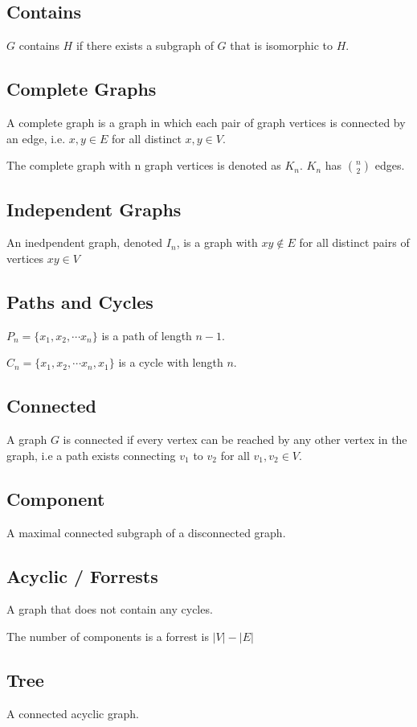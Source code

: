 \documentclass{article}
\begin{document}
\subsection{Contains}
$G$ contains $H$ if there exists a subgraph of $G$ that is isomorphic to $H$. 

\subsection{Complete Graphs}
A complete graph is a graph in which each pair of graph vertices is connected by an edge, i.e. $x, y \in E$ for all distinct $x,y \in V$. 

The complete graph with n graph vertices is denoted as $K_n$. $K_n$ has $\binom{n}{2}$ edges.

\subsection{Independent Graphs}
An inedpendent graph, denoted $I_n$, is a graph with $xy \not\in E$ for all distinct pairs of vertices $xy \in V$

\subsection{Paths and Cycles}
$P_n = \{ x_1, x_2, \cdots x_n \}$ is a path of length $n-1$.

$C_n = \{ x_1, x_2, \cdots x_n, x_1 \}$ is a cycle with length $n$.

\subsection{Connected}
A graph $G$ is connected if every vertex can be reached by any other vertex in the graph, i.e a path exists connecting $v_1$ to $v_2$ for all $v_1,v_2 \in V$.

\subsection{Component}
A maximal connected subgraph of a disconnected graph.

\subsection{Acyclic / Forrests}
A graph that does not contain any cycles.

The number of components is a forrest is $|V| - |E|$

\subsection{Tree}
A connected acyclic graph.
\end{document}
